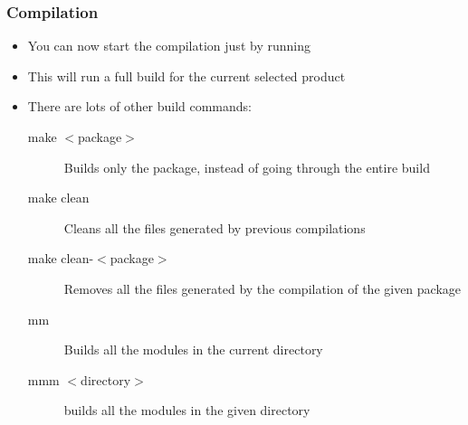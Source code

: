 \begin{frame}[fragile]
  \frametitle{Compilation}
  \begin{itemize}
  \item You can now start the compilation just by running 
  \item This will run a full build for the current selected product
  \item There are lots of other build commands:
    \begin{description}
    \item[make $<$package$>$] Builds only the package, instead of
      going through the entire build
    \item[make clean] Cleans all the files generated by previous
      compilations
    \item[make clean-$<$package$>$] Removes all the files generated by
      the compilation of the given package
    \item[mm] Builds all the modules in the current directory
    \item[mmm $<$directory$>$] builds all the modules in the given
      directory
    \end{description}
  \end{itemize}
\end{frame}
